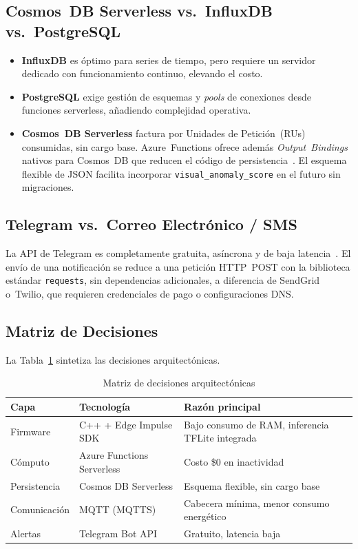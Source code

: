 \documentclass[journal,transmag]{IEEEtran}
\begin{document}
\subsection{Cosmos~DB Serverless vs.\ InfluxDB vs.\ PostgreSQL}

\begin{itemize}
  \item \textbf{InfluxDB} es \'optimo para series de tiempo, pero requiere un servidor dedicado con funcionamiento continuo, elevando el costo.
  \item \textbf{PostgreSQL} exige gesti\'on de esquemas y \textit{pools} de conexiones desde funciones serverless, a\~nadiendo complejidad operativa.
  \item \textbf{Cosmos~DB Serverless} factura por Unidades de
        Petici\'on~(RUs) consumidas, sin cargo base. Azure~Functions ofrece
        adem\'as \textit{Output~Bindings} nativos para Cosmos~DB que reducen el
        c\'odigo de persistencia~\cite{cosmos_binding}. El esquema flexible de
        JSON facilita incorporar \texttt{visual\_anomaly\_score} en el futuro
        sin migraciones.
\end{itemize}

\subsection{Telegram vs.\ Correo Electr\'onico / SMS}

La API de Telegram es completamente gratuita, as\'incrona y de baja
latencia~\cite{telegram_api}. El env\'io de una notificaci\'on se reduce a una petici\'on HTTP~POST con la biblioteca est\'andar \texttt{requests}, sin dependencias adicionales, a diferencia de SendGrid o~Twilio, que requieren credenciales de pago o configuraciones DNS.

\subsection{Matriz de Decisiones}

La Tabla~\ref{tab:matriz} sintetiza las decisiones arquitect\'onicas.

\begin{table}[!t]
\caption{Matriz de decisiones arquitect\'onicas}
\label{tab:matriz}
\centering
\renewcommand{\arraystretch}{1.2}
\begin{tabularx}{\columnwidth}{p{1.4cm} p{1.7cm} X}
\toprule
\textbf{Capa} & \textbf{Tecnolog\'ia} & \textbf{Raz\'on principal} \\
\midrule
Firmware      & C++ + Edge Impulse SDK        & Bajo consumo de RAM, inferencia TFLite integrada \\
C\'omputo     & Azure Functions Serverless     & Costo \$0 en inactividad \\
Persistencia  & Cosmos DB Serverless           & Esquema flexible, sin cargo base \\
Comunicaci\'on & MQTT (MQTTS)                  & Cabecera m\'inima, menor consumo energ\'etico \\
Alertas       & Telegram Bot API               & Gratuito, latencia baja \\
\bottomrule
\end{tabularx}
\end{table}
\end{document}
